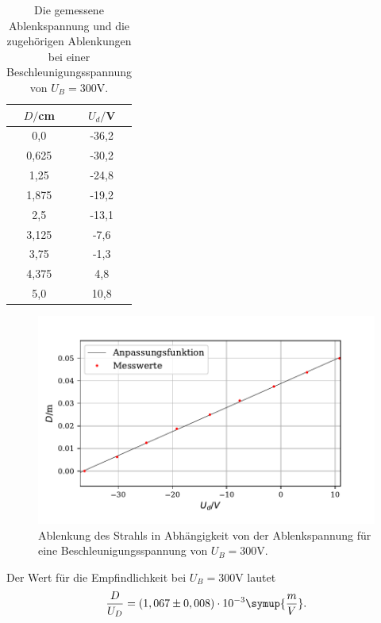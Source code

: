 \begin{table}[H]
  \centering
  \caption{Die gemessene Ablenkspannung und die zugehörigen Ablenkungen bei einer Beschleunigungsspannung von $U_B = 300 \si{\volt}$.}
  \label{tab:Parameter}
  \begin{tabular}{c c}
    \toprule
    $D/$cm& $U_d/$V \\
    \bottomrule
    0,0 & -36,2 \\
     0,625 & -30,2  \\
     1,25 & -24,8 \\
     1,875 & -19,2  \\
     2,5 & -13,1 \\
     3,125 & -7,6  \\
     3,75& -1,3 \\
     4,375 & 4,8  \\
     5,0 &  10,8 \\
     \bottomrule
  \end{tabular}
\end{table}

\begin{figure}[H]
  \centering
  \includegraphics{plot5.pdf}
  \caption{Ablenkung des Strahls in Abhängigkeit von der Ablenkspannung für eine Beschleunigungsspannung von $U_B = 300 \si{\volt}$. }
  \label{fig:plot}
\end{figure}

Der Wert für die Empfindlichkeit bei $U_B = 300 \si{\volt}$ lautet
\begin{align*}
\frac{D}{U_D} = (1,067 \pm 0,008) \cdot 10^{-3} \symup{\frac{m}{V}} .
\end{align*}

